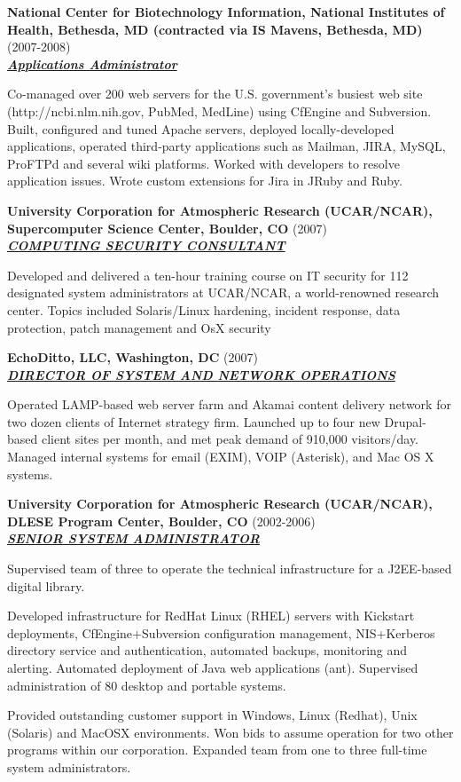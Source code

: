 \documentclass{article}
\newcommand{\employer}[3]{{ \textbf{#1} (#2)\\ \underline{\textbf{\emph{#3}}}\\  }}
\newenvironment{achievements}{\begin{list}{\topsep 0pt \itemsep -2pt}} {\vspace*{4pt}\end{list}}
\begin{document}
\employer{National Center for Biotechnology Information, National Institutes
of Health, Bethesda, MD (contracted via IS Mavens, Bethesda,
MD)}{2007-2008}{Applications Administrator}
\begin{achievements}
   \item Co-managed over 200 web servers for the U.S. government's busiest web site (http://ncbi.nlm.nih.gov, PubMed, MedLine) using CfEngine and Subversion.  Built, configured and tuned Apache servers, deployed locally-developed applications, operated third-party applications such as Mailman, JIRA, MySQL, ProFTPd and several wiki platforms.  Worked with developers to resolve application issues.  Wrote custom extensions for Jira in JRuby and Ruby.
\end{achievements}

\employer{University Corporation for Atmospheric Research (UCAR/NCAR),
Supercomputer Science Center, Boulder, CO}{2007}{COMPUTING SECURITY CONSULTANT}

\begin{achievements}
\item Developed and delivered a ten-hour training course on IT security for 112 designated system administrators at UCAR/NCAR, a world-renowned research center.  Topics included Solaris/Linux hardening, incident response, data protection, patch management and OsX security
\end{achievements}

\employer{EchoDitto, LLC, Washington, DC}{2007}{DIRECTOR OF SYSTEM AND NETWORK OPERATIONS}
\begin{achievements}
  \item Operated LAMP-based web server farm and Akamai content delivery network for two dozen clients of Internet strategy firm.  Launched up to four new Drupal-based client sites per month, and met peak demand of 910,000 visitors/day.  Managed internal systems for email (EXIM), VOIP (Asterisk), and Mac OS X systems. 
\end{achievements}
 
\employer{University Corporation for Atmospheric Research (UCAR/NCAR), DLESE
Program Center, Boulder, CO}{2002-2006}{SENIOR SYSTEM ADMINISTRATOR}
\begin{achievements}
    \item Supervised team of three to operate the technical infrastructure for a J2EE-based digital library.  
    \item Developed infrastructure for RedHat Linux (RHEL) servers with Kickstart deployments, CfEngine+Subversion configuration management, NIS+Kerberos directory service and authentication, automated backups, monitoring and alerting.  Automated deployment of Java web applications (ant). Supervised administration of 80 desktop and portable systems.  
    \item Provided outstanding customer support in Windows, Linux (Redhat), Unix (Solaris) and MacOSX environments.  Won bids to assume operation for two other programs within our corporation.  Expanded team from one to three full-time system administrators. 
\end{achievements}
\end{document}
